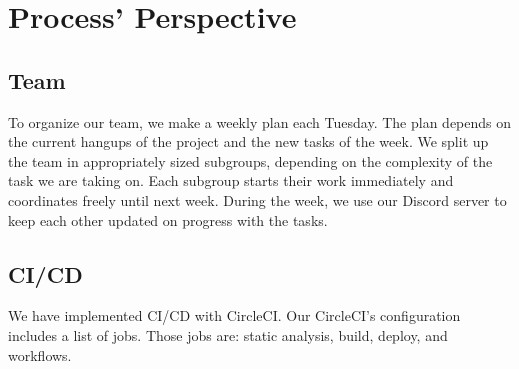 \section{Process' Perspective}

\subsection{Team}
To organize our team, we make a weekly plan each Tuesday. The plan depends on the current hangups of the project and the new tasks of the week. \newline
We split up the team in appropriately sized subgroups, depending on the complexity of the task we are taking on.
Each subgroup starts their work immediately and coordinates freely until next week. During the week, we use our Discord server to keep each other updated on progress with the tasks.


\subsection{CI/CD}\label{CI/CD}

We have implemented CI/CD with CircleCI. Our CircleCI's configuration includes a list of jobs. Those jobs are: static analysis, build, deploy, and workflows.

